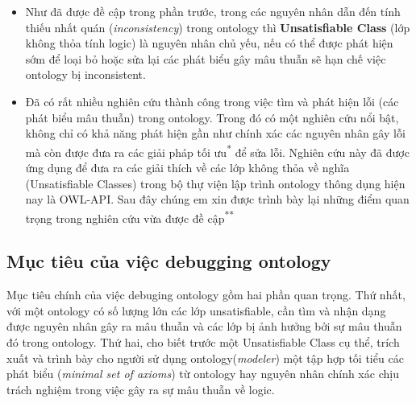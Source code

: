 		\begin{itemize}
			\item Như đã được đề cập trong phần trước, trong các nguyên nhân dẫn đến tính thiếu nhất quán (\textit{inconsistency}) trong ontology thì \textbf{Unsatisfiable Class} (lớp không thỏa tính logic) là nguyên nhân chủ yếu, nếu có thể được phát hiện sớm để loại bỏ hoặc sửa lại các phát biểu gây mâu thuẫn sẽ hạn chế việc ontology bị inconsistent.
			\item Đã có rất nhiều nghiên cứu thành công trong việc tìm và phát hiện lỗi (các phát biểu mâu thuẫn) trong ontology. Trong đó có một nghiên cứu nổi bật\cite{repair}, không chỉ có khả năng phát hiện gần như chính xác các nguyên nhân gây lỗi mà còn được đưa ra các giải pháp tối ưu\textsuperscript{*} để sửa lỗi. Nghiên cứu này đã được ứng dụng để đưa ra các giải thích về các lớp không thỏa về nghĩa (Unsatisfiable Classes) trong bộ thự viện lập trình ontology thông dụng hiện nay là OWL-API\cite{owlapi}. Sau đây chúng em xin được trình bày lại những điểm quan trọng trong nghiên cứu vừa được đề cập\textsuperscript{**}
		\end{itemize}
		
		
		\subsection{Mục tiêu của việc debugging ontology}
		Mục tiêu chính của việc debuging ontology gồm hai phần quan trọng. Thứ nhất, với một ontology có số lượng lớn các lớp unsatisfiable, cần tìm và nhận dạng được nguyên nhân gây ra mâu thuẫn và các lớp bị ảnh hưởng bởi sự mâu thuẫn đó trong ontology. Thứ hai, cho biết trước một Unsatisfiable Class cụ thể, trích xuất và trình bày cho người sử dụng ontology(\textit{modeler}) một tập hợp tối tiểu các phát biểu (\textit{minimal set of axioms}) từ ontology hay nguyên nhân chính xác chịu trách nghiệm trong việc gây ra sự mâu thuẫn về logic.
		\\
